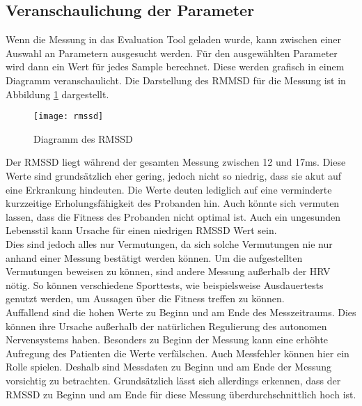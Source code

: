 \subsection{Veranschaulichung der Parameter} \label{sec:anschaulich}
Wenn die Messung in das Evaluation Tool geladen wurde, kann zwischen einer Auswahl an Parametern ausgesucht werden. Für den ausgewählten Parameter wird dann ein Wert für jedes Sample berechnet. Diese werden grafisch in einem Diagramm veranschaulicht. Die Darstellung des RMMSD für die Messung ist in Abbildung \ref{fig:rmssd} dargestellt.
\begin{figure}[H]
	\centering
	\texttt{[image: rmssd]}
	\caption{Diagramm des RMSSD}
	\label{fig:rmssd}
\end{figure}
Der RMSSD liegt während der gesamten Messung zwischen 12 und 17ms. Diese Werte sind grundsätzlich eher gering, jedoch nicht so niedrig, dass sie akut auf eine Erkrankung hindeuten. Die Werte deuten lediglich auf eine verminderte kurzzeitige Erholungsfähigkeit des Probanden hin. Auch könnte sich vermuten lassen, dass die Fitness des Probanden nicht optimal ist. Auch ein ungesunden Lebensstil kann Ursache für einen niedrigen RMSSD Wert sein. \\
Dies sind jedoch alles nur Vermutungen, da sich solche Vermutungen nie nur anhand einer Messung bestätigt werden können. Um die aufgestellten Vermutungen beweisen zu können, sind andere Messung außerhalb der HRV nötig. So können verschiedene Sporttests, wie beispielsweise Ausdauertests genutzt werden, um Aussagen über die Fitness treffen zu können.\\
Auffallend sind die hohen Werte zu Beginn und am Ende des Messzeitraums. Dies können ihre Ursache außerhalb der natürlichen Regulierung des autonomen Nervensystems haben. Besonders zu Beginn der Messung kann eine erhöhte Aufregung des Patienten die Werte verfälschen. Auch Messfehler können hier ein Rolle spielen. Deshalb sind Messdaten zu Beginn und am Ende der Messung vorsichtig zu betrachten. Grundsätzlich lässt sich allerdings erkennen, dass der RMSSD zu Beginn und am Ende für diese Messung überdurchschnittlich hoch ist.


